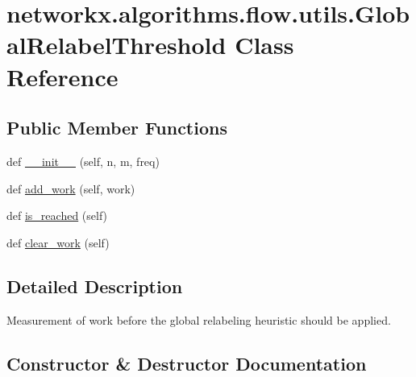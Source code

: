 \hypertarget{classnetworkx_1_1algorithms_1_1flow_1_1utils_1_1GlobalRelabelThreshold}{}\section{networkx.\+algorithms.\+flow.\+utils.\+Global\+Relabel\+Threshold Class Reference}
\label{classnetworkx_1_1algorithms_1_1flow_1_1utils_1_1GlobalRelabelThreshold}
\subsection*{Public Member Functions}
\begin{DoxyCompactItemize}
\item 
def \hyperlink{classnetworkx_1_1algorithms_1_1flow_1_1utils_1_1GlobalRelabelThreshold_a3ccb6f03222d526af5adfe4333d56c8d}{\+\_\+\+\_\+init\+\_\+\+\_\+} (self, n, m, freq)
\item 
def \hyperlink{classnetworkx_1_1algorithms_1_1flow_1_1utils_1_1GlobalRelabelThreshold_aaf0ea0a1782c68bc7c6a541b786e4348}{add\+\_\+work} (self, work)
\item 
def \hyperlink{classnetworkx_1_1algorithms_1_1flow_1_1utils_1_1GlobalRelabelThreshold_aea1ab5f0837863b907d0a4a5cd24c78b}{is\+\_\+reached} (self)
\item 
def \hyperlink{classnetworkx_1_1algorithms_1_1flow_1_1utils_1_1GlobalRelabelThreshold_a86348aecd55a0e1c8899ed3104ee9cc7}{clear\+\_\+work} (self)
\end{DoxyCompactItemize}


\subsection{Detailed Description}
\begin{DoxyVerb}Measurement of work before the global relabeling heuristic should be
applied.
\end{DoxyVerb}
 

\subsection{Constructor \& Destructor Documentation}
\mbox{\label{classnetworkx_1_1algorithms_1_1flow_1_1utils_1_1GlobalRelabelThreshold_a3ccb6f03222d526af5adfe4333d56c8d}} 
